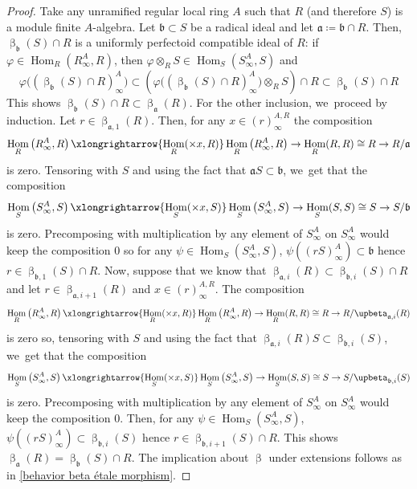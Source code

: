 \documentclass[JEP,XML,SOM,Unicode,published]{cedram}
\let\autoref\cref
\theoremstyle{plain}
\theoremstyle{definition}
\numberwithin{equation}{theorem}
\let\tensor\otimes
\newcommand{\fra}{\mathfrak{a}}
\newcommand{\frab}{\mathfrak{b}}
\DeclareMathOperator{\Hom}{Hom}
\renewcommand{\phi}{\varphi}
\newcommand{\rafty}{R^A_\infty}
\newcommand{\safty}{S^A_\infty}
\begin{document}
\begin{proof}
Take any unramified regular local ring $A$ such that $R$ (and therefore $S$) is a module finite $A$-algebra. Let $\frab\subset S$ be a radical ideal and let $\fra\coloneqq \frab\cap R$. Then, $\upbeta_\frab(S) \cap R$ is a uniformly perfectoid compatible ideal of $R$: if $\phi\in \Hom_R(\rafty,R)$, then $\phi\tensor_R S\in \Hom_S(\safty,S)$ and\vspace*{-3pt}
\[
\phi\bigl(\left(\upbeta_\frab(S)\cap R\right)^A_\infty\bigl)\subset \left(\phi\bigl(\left(\upbeta_\frab(S)\cap R\right)^A_\infty\bigr)\tensor_R S\right)\cap R \subset \upbeta_\frab(S)\cap R
\]
This shows $\upbeta_\frab(S)\cap R\subset \upbeta_\fra(R)$. For the other inclusion, we~proceed by induction. Let $r\in \upbeta_{\fra,1}(R)$. Then, for any $x\in (r)^{A, R}_\infty$ the composition\vspace*{-3pt}
\[
\Hom_R\left(\rafty,R\right)\xlongrightarrow{\Hom_R(\times x, R)}\Hom_R\left(\rafty,R\right) \to \Hom_R(R,R)\cong R \to R/\fra
\]
is zero. Tensoring with $S$ and using the fact that $\fra S\subset \frab$, we~get that the composition\vspace*{-3pt}
\[
\Hom_S\left(\safty,S\right)\xlongrightarrow{\Hom_S(\times x, S)}\Hom_S\left(\safty,S\right) \to \Hom_S(S,S)\cong S \to S/\frab
\]
is zero. Precomposing with multiplication by any element of $\safty$ on $\safty$ would keep the composition $0$ so for any $\psi\in \Hom_S(\safty,S)$, $\psi((rS)^A_\infty)\subset \frab$ hence $r\in \upbeta_{\frab,1} (S) \cap R$. Now, suppose that we know that $\upbeta_{\fra,i}(R)\subset \upbeta_{\frab,i} (S)\cap R$ and let $r\in \upbeta_{\fra,i+1}(R)$ and $x \in (r)^{A,R}_\infty$.
The composition\vspace*{-3pt}
\[
\Hom_R\left(\rafty,R\right)\xlongrightarrow{\Hom_R(\times x, R)}\Hom_R\left(\rafty,R\right) \to \Hom_R(R,R)\cong R \to R/\upbeta_{\fra,i}(R)
\]
is zero so, tensoring with $S$ and using the fact that $\upbeta_{\fra,i}(R) S\subset \upbeta_{\frab,i}(S)$, we~get that the composition\vspace*{-3pt}
\[
\Hom_S\left(\safty,S\right)\xlongrightarrow{\Hom_S(\times x, S)}\Hom_S\left(\safty,S\right) \to \Hom_S(S,S)\cong S \to S/\upbeta_{\frab,i}(S)
\]
is zero. Precomposing with multiplication by any element of $\safty$ on $\safty$ would keep the composition $0$. Then, for any $\psi\in \Hom_S(\safty,S)$, $\psi((rS)^A_\infty)\subset \upbeta_{\frab,i}(S)$ hence $r\in \upbeta_{\frab,i+1} (S) \cap R$. This shows $\upbeta_\fra(R)=\upbeta_\frab(S)\cap R$.
The implication about $\upbeta$ under extensions follows as in \autoref{behavior beta étale morphism}.
\end{proof}
\end{document}
